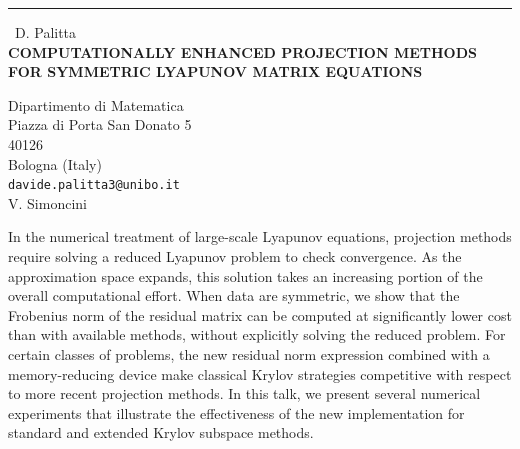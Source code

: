 \documentclass{report}
\begin{document}
\begin{center}
\rule{6in}{1pt} \
{\large D. Palitta \\
{\bf COMPUTATIONALLY ENHANCED PROJECTION METHODS FOR SYMMETRIC LYAPUNOV MATRIX EQUATIONS}}

Dipartimento di Matematica \\ Piazza di Porta San Donato 5 \\ 40126 \\ Bologna (Italy)
\\
{\tt davide.palitta3@unibo.it}\\
V. Simoncini\end{center}

In the numerical treatment of large-scale Lyapunov equations, projection
methods require solving a reduced Lyapunov problem to check convergence.
As the approximation space expands, this solution takes an increasing
portion of the overall computational effort. When data are symmetric, we
show that the Frobenius norm of the residual matrix can be computed at
significantly lower cost than with available methods, without explicitly
solving the reduced problem. For certain classes of problems, the new
residual norm expression combined with a memory-reducing device make
classical Krylov strategies competitive with respect to more recent
projection methods. In this talk, we present several numerical
experiments that illustrate the effectiveness of the new implementation
for standard and extended Krylov subspace methods.
\end{document}

